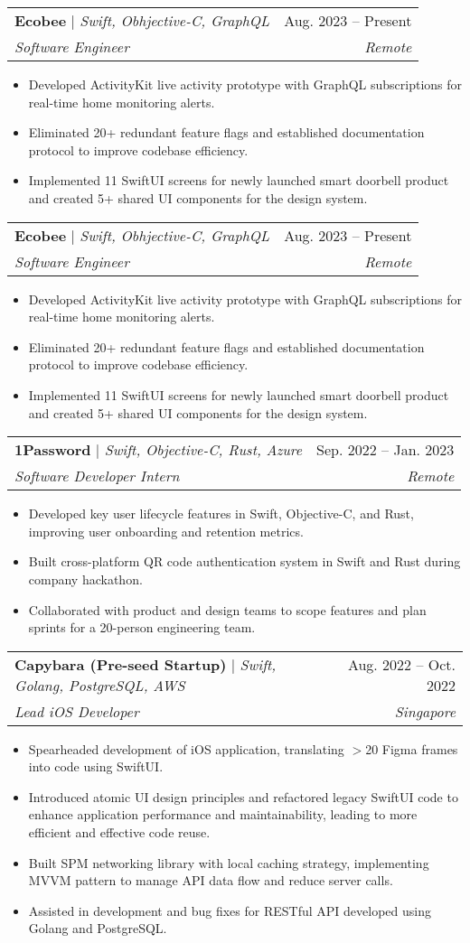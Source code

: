 \documentclass[letterpaper,11pt]{article}
\makeatletter
\newcommand{\resumeItem}[1]{
  \item\small{
    {#1 \vspace{-1pt}}  %
  }
}
\newcommand{\resumeSubheading}[4]{
  \vspace{-1pt}\item
    \begin{tabular*}{0.97\textwidth}[t]{l@{\extracolsep{\fill}}r}
      #1 & #2 \\  %
      \textit{\small#3} & \textit{\small #4} \\
    \end{tabular*}\vspace{-5pt}
}
\newcommand{\resumeItemListStart}{\begin{itemize}}
\newcommand{\resumeItemListEnd}{\end{itemize}\vspace{-5pt}}
\makeatother
\begin{document}
  \resumeSubheading
  {\textbf{Ecobee} $|$ \emph{Swift, Obhjective-C, GraphQL}}{Aug. 2023 -- Present}
  {Software Engineer}{Remote}
  \resumeItemListStart
  \resumeItem{Developed ActivityKit live activity prototype with GraphQL subscriptions for real-time home monitoring alerts.}
  \resumeItem{Eliminated 20+ redundant feature flags and established documentation protocol to improve codebase efficiency.}
  \resumeItem{Implemented 11 SwiftUI screens for newly launched smart doorbell product and created 5+ shared UI components for the design system.}
  \resumeItemListEnd

    \resumeSubheading
      {\textbf{Ecobee} $|$ \emph{Swift, Obhjective-C, GraphQL}}{Aug. 2023 -- Present}
      {Software Engineer}{Remote}
      \resumeItemListStart
      \resumeItem{Developed ActivityKit live activity prototype with GraphQL subscriptions for real-time home monitoring alerts.}
      \resumeItem{Eliminated 20+ redundant feature flags and established documentation protocol to improve codebase efficiency.}
      \resumeItem{Implemented 11 SwiftUI screens for newly launched smart doorbell product and created 5+ shared UI components for the design system.}
      \resumeItemListEnd
      
    \resumeSubheading
      {\textbf{1Password} $|$ \emph{Swift, Objective-C, Rust, Azure}}{Sep. 2022 -- Jan. 2023}
      {Software Developer Intern}{Remote}
      \resumeItemListStart
      \resumeItem{Developed key user lifecycle features in Swift, Objective-C, and Rust, improving user onboarding and retention metrics.}
      \resumeItem{Built cross-platform QR code authentication system in Swift and Rust during company hackathon.}
      \resumeItem{Collaborated with product and design teams to scope features and plan sprints for a 20-person engineering team.}
      \resumeItemListEnd
    
      \resumeSubheading
      {\textbf{Capybara (Pre-seed Startup)} $|$ \emph{Swift, Golang, PostgreSQL, AWS}}{Aug. 2022 -- Oct. 2022}
      {Lead iOS Developer}{Singapore}
      \resumeItemListStart
        \resumeItem{Spearheaded development of iOS application, translating $>$20 Figma frames into code using SwiftUI.}
        \resumeItem{Introduced atomic UI design principles and refactored legacy SwiftUI code to enhance application performance and maintainability, leading to more efficient and effective code reuse.}
        \resumeItem{Built SPM networking library with local caching strategy, implementing MVVM pattern to manage API data flow and reduce server calls.}
        \resumeItem{Assisted in development and bug fixes for RESTful API developed using Golang and PostgreSQL.}
        \resumeItemListEnd
\end{document}
